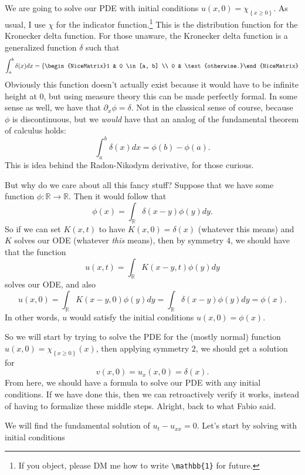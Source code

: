 \begin{remark}
We are going to solve our PDE with initial conditions \( u(x, 0) = \chi_{\left\{ x \ge 0 \right\}} \). As usual, I use \( \chi \) for the indicator function.\footnote{If you object, please DM me how to write \texttt{\textbackslash{}mathbb\{1\}} for future.} This is the distribution function for the Kronecker delta function. For those unaware, the Kronecker delta function is a generalized function \( \delta \) such that
\[ \int_{a}^{b} \delta(x) dx = \left\{\begin{NiceMatrix}1 & 0 \in [a, b] \\ 0 & \text{otherwise.}\end{NiceMatrix}\right. \]
Obviously this function doesn't actually exist because it would have to be infinite height at \( 0 \), but using measure theory this can be made perfectly formal. In some sense as well, we have that \( \partial_{x} \phi = \delta \). Not in the classical sense of course, because \( \phi \) is discontinuous, but we \textit{would} have that an analog of the fundamental theorem of calculus holds:
\[ \int_{a}^{b} \delta(x) dx = \phi(b) - \phi(a). \]
This is idea behind the Radon-Nikodym derivative, for those curious. 

But why do we care about all this fancy stuff? Suppose that we have some function \( \phi : \mathbb{R} \to \mathbb{R} \). Then it would follow that
\[ \phi(x) = \int_{\mathbb{R}} \delta(x-y) \phi(y) dy. \]
So if we can set \( K(x, t) \) to have \( K(x, 0) = \delta(x) \) (whatever this means) and \( K \) solves our ODE (whatever \textit{this} means), then by symmetry \( 4 \), we should have that the function
\[ u(x, t) = \int_{\mathbb{R}} K(x-y, t) \phi(y) dy \]
solves our ODE, and also
\[ u(x, 0) = \int_{\mathbb{R}} K(x-y, 0) \phi(y) dy = \int_{\mathbb{R}} \delta(x-y) \phi(y) dy = \phi(x). \]
In other words, \( u \) would satisfy the initial conditions \( u(x, 0) = \phi(x) \).

So we will start by trying to solve the PDE for the (mostly normal) function \( u(x, 0) = \chi_{\left\{ x \ge 0 \right\}}(x) \), then applying symmetry \( 2 \), we should get a solution for
\[ v(x, 0) = u_{x}(x, 0) = \delta(x). \]
From here, we should have a formula to solve our PDE with any initial conditions. If we have done this, then we can retroactively verify it works, instead of having to formalize these middle steps. Alright, back to what Fabio said.
\end{remark}
We will find the fundamental solution of \( u_{t} - u_{x x} = 0 \). Let's start by solving with initial conditions
